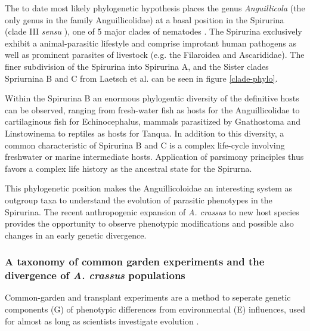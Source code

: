 The to date most likely phylogenetic hypothesis places the genus
\textit{Anguillicola} (the only genus in the family Anguillicolidae)
at a basal position in the Spirurina (clade III \textit{sensu}
\cite{blaxter_molecular_1998}), one of 5 major clades of nematodes
\cite{nadler_molecular_2007, wijov_evolutionary_2006}. The Spirurina
exclusively exhibit a animal-parasitic lifestyle and comprise
improtant human pathogens as well as prominent parasites of livestock
(e.g. the Filaroidea and Ascarididae). The finer subdivision of the
Spirurina into Spirurina A, and the Sister clades Spriurnina B and C
from Laetsch et al. can be seen in figure \ref{clade-phylo}.


Within the Spirurina B an enormous phylogentic diversity of the
definitive hosts can be observed, ranging from fresh-water fish as
hosts for the Anguillicolidae to cartilaginous fish for
Echinocephalus, mammals parasitized by Gnathostoma and Linstowinema to
reptiles as hosts for Tanqua. In addition to this diversity, a common
characteristic of Spirurina B and C is a complex life-cycle involving
freshwater or marine intermediate hosts. Application of parsimony
principles thus favors a complex life history as the ancestral state
for the Spirurna.

This phylogenetic position makes the Anguillicoloidae an interesting
system as outgroup taxa to understand the evolution of parasitic
phenotypes in the Spirurina. The recent anthropogenic expansion of
\textit{A. crassus} to new host species provides the opportunity to
observe phenotypic modifications and possible also changes in an early
genetic divergence.


\subsubsection{A taxonomy of common garden experiments and the
  divergence of \textit{A. crassus} populations}
\label{div-ac}

Common-garden and transplant experiments are a method to seperate
genetic components (G) of phenotypic differences from environmental
(E) influences, used for almost as long as scientists investigate
evolution \cite{kerner_classic_common_garden,
  bonnier_classic_common_garden}.

